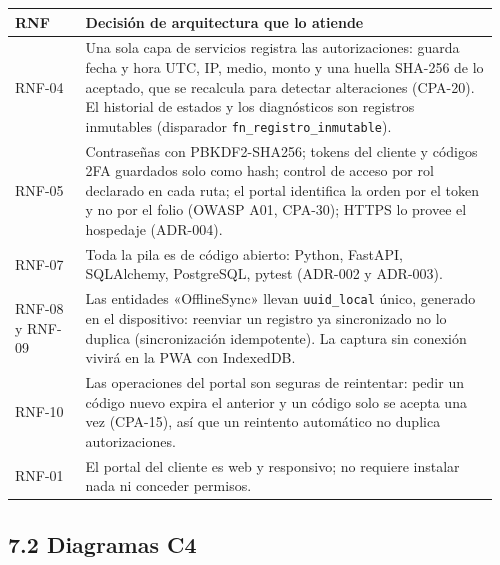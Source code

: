 {\small
\begin{longtable}{@{}L{0.14\linewidth}L{0.82\linewidth}@{}}
\toprule
\textbf{RNF} & \textbf{Decisión de arquitectura que lo atiende} \\
\midrule
\endhead
\bottomrule
\endlastfoot
RNF-04 & Una sola capa de servicios registra las autorizaciones: guarda fecha y hora UTC, IP, medio, monto
y una huella SHA-256 de lo aceptado, que se recalcula para detectar alteraciones (CPA-20). El historial de
estados y los diagnósticos son registros inmutables (disparador \texttt{fn\_registro\_inmutable}). \\
RNF-05 & Contraseñas con PBKDF2-SHA256; tokens del cliente y códigos 2FA guardados solo como hash; control
de acceso por rol declarado en cada ruta; el portal identifica la orden por el token y no por el folio
(OWASP A01, CPA-30); HTTPS lo provee el hospedaje (ADR-004). \\
RNF-07 & Toda la pila es de código abierto: Python, FastAPI, SQLAlchemy, PostgreSQL, pytest (ADR-002 y
ADR-003). \\
RNF-08 y RNF-09 & Las entidades «OfflineSync» llevan \texttt{uuid\_local} único, generado en el dispositivo:
reenviar un registro ya sincronizado no lo duplica (sincronización idempotente). La captura sin conexión
vivirá en la PWA con IndexedDB.  \\
RNF-10 & Las operaciones del portal son seguras de reintentar: pedir un código nuevo expira el anterior y
un código solo se acepta una vez (CPA-15), así que un reintento automático no duplica autorizaciones. \\
RNF-01 & El portal del cliente es web y responsivo; no requiere instalar nada ni conceder permisos. \\
\end{longtable}
}

\subsection{7.2 Diagramas C4}\label{diagramas-c4}



